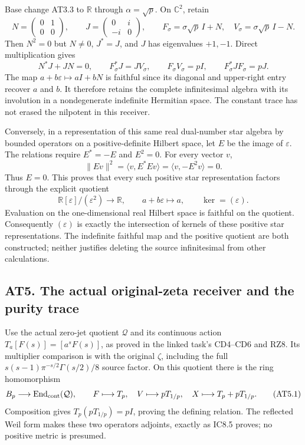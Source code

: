 \documentclass[
]{article}
\begin{document}
Base change AT3.3 to \(\mathbb R\) through \(\alpha=\sqrt p\). On
\(\mathbb C^2\), retain \[
N=\begin{pmatrix}0&1\\0&0\end{pmatrix},\qquad
J=\begin{pmatrix}0&i\\-i&0\end{pmatrix},\qquad
F_\sigma=\sigma\sqrt p\,I+N,\quad
V_\sigma=\sigma\sqrt p\,I-N.
\tag{AT4.1}
\] Then \(N^2=0\) but \(N\ne0\), \(J^*=J\), and \(J\) has eigenvalues
\(+1,-1\). Direct multiplication gives \[
N^*J+JN=0,\qquad
F_\sigma^*J=JV_\sigma,\qquad
F_\sigma V_\sigma=pI,\qquad F_\sigma^*JF_\sigma=pJ.
\tag{AT4.2}
\] The map \(a+b\varepsilon\mapsto aI+bN\) is faithful since its
diagonal and upper-right entry recover \(a\) and \(b\). It therefore
retains the complete infinitesimal algebra with its involution in a
nondegenerate indefinite Hermitian space. The constant trace has not
erased the nilpotent in this receiver.

Conversely, in a representation of this same real dual-number star
algebra by bounded operators on a positive-definite Hilbert space, let
\(E\) be the image of \(\varepsilon\). The relations require \(E^*=-E\)
and \(E^2=0\). For every vector \(v\), \[
\|Ev\|^2=\langle v,E^*Ev\rangle
=\langle v,-E^2v\rangle=0.
\tag{AT4.3}
\] Thus \(E=0\). This proves that every such positive star
representation factors through the explicit quotient \[
\mathbb R[\varepsilon]/(\varepsilon^2)\longrightarrow\mathbb R,
\qquad a+b\varepsilon\longmapsto a,
\qquad\ker=(\varepsilon).
\tag{AT4.4}
\] Evaluation on the one-dimensional real Hilbert space is faithful on
the quotient. Consequently \((\varepsilon)\) is exactly the intersection
of kernels of these positive star representations. The indefinite
faithful map and the positive quotient are both constructed; neither
justifies deleting the source infinitesimal from other calculations.

\subsection{AT5. The actual original-zeta receiver and the purity
trace}\label{at5.-the-actual-original-zeta-receiver-and-the-purity-trace}

Use the actual zero-jet quotient \(\mathcal Q\) and its continuous
action \(T_a[F(s)]=[a^sF(s)]\), as proved in the linked task's CD4--CD6
and RZ8. Its multiplier comparison is with the original \(\zeta\),
including the full \(s(s-1)\pi^{-s/2}\Gamma(s/2)/8\) source factor. On
this quotient there is the ring homomorphism \[
B_p\longrightarrow\operatorname{End}_{\rm cont}(\mathcal Q),
\qquad F\longmapsto T_p,
\quad V\longmapsto pT_{1/p},
\quad X\longmapsto T_p+pT_{1/p}.
\tag{AT5.1}
\] Composition gives \(T_p(pT_{1/p})=pI\), proving the defining
relation. The reflected Weil form makes these two operators adjoints,
exactly as IC8.5 proves; no positive metric is presumed.
\end{document}
